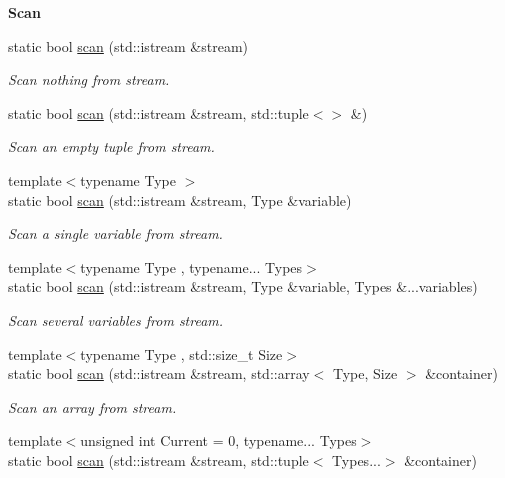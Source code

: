 \begin{Indent}{\bf Scan}\par
\begin{DoxyCompactItemize}
\item 
static bool \hyperlink{exceptionmagrathea_1_1DataHandler_a5e26ce4a9478dcc7c83d904bf8c494f6}{scan} (std\-::istream \&stream)
\begin{DoxyCompactList}\small\item\em Scan nothing from stream. \end{DoxyCompactList}\item 
static bool \hyperlink{exceptionmagrathea_1_1DataHandler_a2694fc43019f85c66b1f88b4db924f85}{scan} (std\-::istream \&stream, std\-::tuple$<$$>$ \&)
\begin{DoxyCompactList}\small\item\em Scan an empty tuple from stream. \end{DoxyCompactList}\item 
{\footnotesize template$<$typename Type $>$ }\\static bool \hyperlink{exceptionmagrathea_1_1DataHandler_a2f0d2f234267a5c274662c6fe48fe988}{scan} (std\-::istream \&stream, Type \&variable)
\begin{DoxyCompactList}\small\item\em Scan a single variable from stream. \end{DoxyCompactList}\item 
{\footnotesize template$<$typename Type , typename... Types$>$ }\\static bool \hyperlink{exceptionmagrathea_1_1DataHandler_adefa5bd26a29d5b13d3f94a45bd99973}{scan} (std\-::istream \&stream, Type \&variable, Types \&...variables)
\begin{DoxyCompactList}\small\item\em Scan several variables from stream. \end{DoxyCompactList}\item 
{\footnotesize template$<$typename Type , std\-::size\-\_\-t Size$>$ }\\static bool \hyperlink{exceptionmagrathea_1_1DataHandler_abf322f4399f6008717153ca2338c1ab3}{scan} (std\-::istream \&stream, std\-::array$<$ Type, Size $>$ \&container)
\begin{DoxyCompactList}\small\item\em Scan an array from stream. \end{DoxyCompactList}\item 
{\footnotesize template$<$unsigned int Current = 0, typename... Types$>$ }\\static bool \hyperlink{exceptionmagrathea_1_1DataHandler_afcdea61c7011b22539e783c9fb782e07}{scan} (std\-::istream \&stream, std\-::tuple$<$ Types...$>$ \&container)
$$
\end{DoxyCompactItemize}
\end{Indent}

